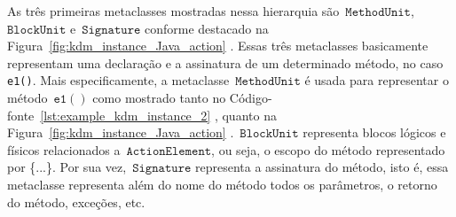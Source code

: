 


As três primeiras metaclasses mostradas nessa hierarquia são~$\mathtt{MethodUnit}$,~$\mathtt{BlockUnit}$ e~$\mathtt{Signature}$ conforme destacado na  Figura~\ref{fig:kdm_instance_Java_action} . Essas três metaclasses basicamente representam uma declaração e a assinatura de um determinado método, no caso \texttt{e1()}. Mais especificamente, a metaclasse~$\mathtt{MethodUnit}$ é usada para representar o método~$\mathtt{e1()}$ como mostrado tanto no Código-fonte~\ref{lst:example_kdm_instance_2} , quanto na Figura~\ref{fig:kdm_instance_Java_action} .~$\mathtt{BlockUnit}$ representa blocos lógicos e físicos relacionados a~$\mathtt{ActionElement}$, ou seja, o escopo do método representado por \{...\}. Por sua vez,~$\mathtt{Signature}$ representa a assinatura do método, isto é, essa metaclasse representa além do nome do método todos os parâmetros, o retorno do método, exceções, etc.	


